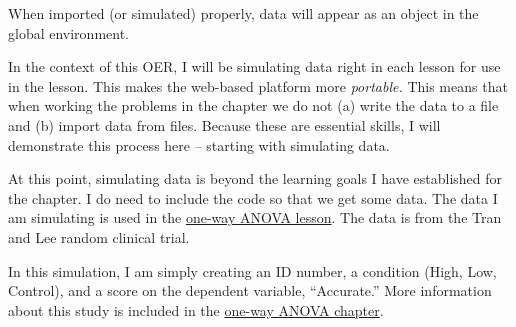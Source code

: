 \documentclass[
  11pt,
]{book}
\begin{document}
When imported (or simulated) properly, data will appear as an object in the global environment.

In the context of this OER, I will be simulating data right in each lesson for use in the lesson. This makes the web-based platform more \emph{portable.} This means that when working the problems in the chapter we do not (a) write the data to a file and (b) import data from files. Because these are essential skills, I will demonstrate this process here -- starting with simulating data.

At this point, simulating data is beyond the learning goals I have established for the chapter. I do need to include the code so that we get some data. The data I am simulating is used in the \protect\hyperlink{oneway}{one-way ANOVA lesson}. The data is from the Tran and Lee \citeyearpar{tran_you_2014} random clinical trial.

In this simulation, I am simply creating an ID number, a condition (High, Low, Control), and a score on the dependent variable, ``Accurate.'' More information about this study is included in the \protect\hyperlink{oneway}{one-way ANOVA chapter}.
\end{document}

